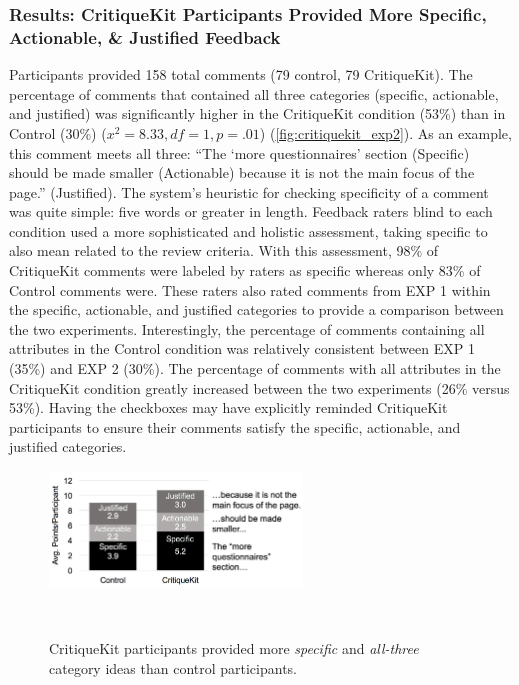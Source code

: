 \subsubsection{Results: CritiqueKit Participants Provided More Specific, Actionable, \& Justified Feedback}
Participants provided 158 total comments (79 control, 79 CritiqueKit). The percentage of comments that contained all three categories (specific, actionable, and justified) was significantly higher in the CritiqueKit condition (53\%) than in Control (30\%) ($x^2=8.33, df = 1, p = .01$) (\autoref{fig:critiquekit_exp2}). As an example, this comment meets all three: ``The `more questionnaires' section (Specific) should be made smaller (Actionable) because it is not the main focus of the page.'' (Justified). The system's heuristic for checking specificity of a comment was quite simple: five words or greater in length. Feedback raters blind to each condition used a more sophisticated and holistic assessment, taking specific to also mean related to the review criteria. With this assessment, 98\% of CritiqueKit comments were labeled by raters as specific whereas only 83\% of Control comments were. These raters also rated comments from EXP 1 within the specific, actionable, and justified categories to provide a comparison between the two experiments. Interestingly, the percentage of comments containing all attributes in the Control condition was relatively consistent between EXP 1 (35\%) and EXP 2 (30\%). The percentage of comments with all attributes in the CritiqueKit condition greatly increased between the two experiments (26\% versus 53\%). Having the checkboxes may have explicitly reminded CritiqueKit participants to ensure their comments satisfy the specific, actionable, and justified categories.

\begin{figure}
\centering
  \includegraphics[width=0.6\textwidth]{critiquekit/figures/exp2_bar.png}
  \caption{CritiqueKit participants provided more \textit{specific} and \textit{all-three} category ideas than control participants.}~\label{fig:critiquekit_exp2_bar}
\end{figure}

